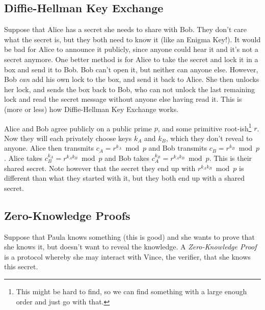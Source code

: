 \subsection{Diffie-Hellman Key Exchange}

Suppose that Alice has a secret she needs to share with Bob. They don't care what the secret is, but they both need to know it (like an Enigma Key!). It would be bad for Alice to announce it publicly, since anyone could hear it and it's not a secret anymore. One better method is for Alice to take the secret and lock it in a box and send it to Bob. Bob can't open it, but neither can anyone else. However, Bob \emph{can}\/ add his own lock to the box, and send it back to Alice. She then unlocks her lock, and sends the box back to Bob, who can not unlock the last remaining lock and read the secret message without anyone else having read it. This is (more or less) how Diffie-Hellman Key Exchange works.

Alice and Bob agree publicly on a public prime $p$, and some primitive root-ish\footnote{This might be hard to find, so we can find something with a large enough order and just go with that.} $r$. Now they will each privately choose keys $k_A$ and $k_B$, which they don't reveal to anyone. Alice then transmits $c_A = r^{k_A} \bmod p$ and Bob transmits $c_B = r^{k_B} \bmod p$. Alice takes $c_B^{k_A} = r^{k_Ak_B} \bmod p$ and Bob takes $c_A^{k_B} = r^{k_Ak_B} \bmod p$. This is their shared secret. Note however that the secret they end up with $r^{k_Ak_B} \bmod p$ is different than what they started with it, but they both end up with a shared secret.

\subsection{Zero-Knowledge Proofs}

Suppose that Paula knows something (this is good) and she wants to prove that she knows it, but doesn't want to reveal the knowledge. A \emph{Zero-Knowledge Proof} is a protocol whereby she may interact with Vince, the verifier, that she knows this secret.

